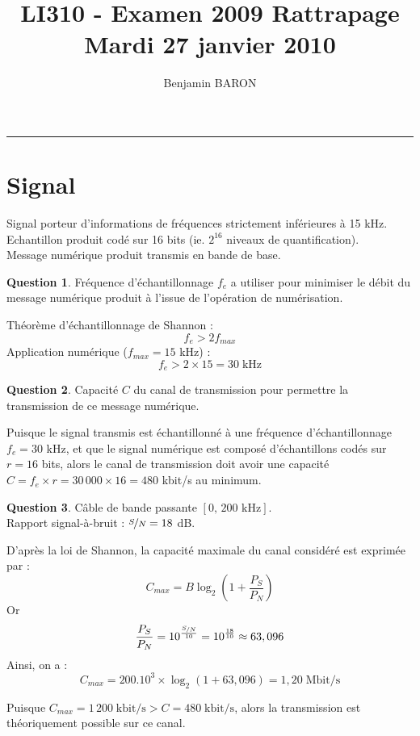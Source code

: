 \documentclass[11pt,english,french]{scrreprt}
\makeatletter
\theoremstyle{remark}
\theoremstyle{definition}
\newtheorem{ques}{Question}[section]
\renewcommand{\maketitle}{\begingroup%
    \let\footnotesize\small
    \let\footnoterule\relax
    \parindent \z@
    \reset@font
    \begin{flushleft}
      \huge \sffamily \bfseries\color{orange} \@title
    \end{flushleft}
    \hrule height 1pt
    \begin{flushright}
      \large\sffamily\color{MyDarkBlue}\@author
    \end{flushright}
  \endgroup%
  \setcounter{footnote}{0}%
}
\makeatother
\begin{document}
	
\title{LI310 - Examen 2009 Rattrapage\\
Mardi 27 janvier 2010}
\author{Benjamin BARON}

\maketitle

\section{Signal} %

Signal porteur d'informations de fréquences strictement inférieures à 15 kHz.\\
Echantillon produit codé sur 16 bits (ie. $2^{16}$ niveaux de quantification).\\
Message numérique produit transmis en bande de base.

\begin{ques}
	Fréquence d'échantillonnage $f_e$ a utiliser pour minimiser le débit du message numérique produit à l'issue de l'opération de numérisation.
	
	Théorème d'échantillonnage de Shannon :\[f_e > 2f_{max}\]
	Application numérique ($f_{max} = 15$ kHz) :\[f_e > 2\times 15 = 30\;\textrm{kHz}\]
\end{ques}

\begin{ques}\label{ques:2}
	Capacité $C$ du canal de transmission pour permettre la transmission de ce message numérique.
	
	Puisque le signal transmis est échantillonné à une fréquence d'échantillonnage $f_e=30$ kHz, et que le signal numérique est composé d'échantillons codés sur $r = 16$ bits, alors le canal de transmission doit avoir une capacité $C=f_e\times r=30\,000\times 16=480$ kbit/s au minimum.
\end{ques}


\begin{ques}
	Câble de bande passante $[0,\,200\textrm{ kHz}]$.\\
	Rapport signal-à-bruit : $\nicefrac{S}{N}=18$ dB.
	
	D'après la loi de Shannon, la capacité maximale du canal considéré est exprimée par :\[C_{max}=B\log_2\left(1+\frac{P_S}{P_N}\right)\]
	Or \[\frac{P_S}{P_N}=10^{\frac{\nicefrac{S}{N}}{10}}= 10^{\frac{18}{10}}\approx 63,096\]
	Ainsi, on a :\[C_{max}=200.10^3\times \log_2(1+63,096)=1,20\;\textrm{Mbit/s}\]
	
	Puisque $C_{max}=1\,200\;\textrm{kbit/s}>C=480\;\textrm{kbit/s}$, alors la transmission est théoriquement possible sur ce canal.
\end{ques}
\end{document}
